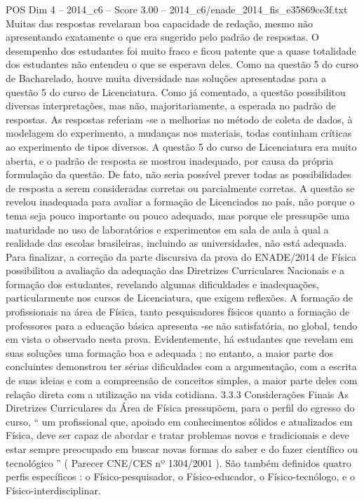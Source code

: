 \begin{textsample}{POS Dim 4 – 2014\_c6 – Score 3.00 – 2014\_c6/enade\_2014\_fis\_e35869ce3f.txt}
Muitas das respostas revelaram boa capacidade de redação, mesmo não apresentando exatamente o que era sugerido pelo padrão de respostas.
O desempenho dos estudantes foi muito fraco e ficou patente que a quase totalidade dos estudantes não entendeu o que se esperava deles.
Como na questão 5 do curso de Bacharelado, houve muita diversidade nas soluções apresentadas para a questão 5 do curso de Licenciatura.
Como já comentado, a questão possibilitou diversas interpretações, mas não, majoritariamente, a esperada no padrão de respostas.
As respostas referiam -se a melhorias no método de coleta de dados, à modelagem do experimento, a mudanças nos materiais, todas continham críticas ao experimento de tipos diversos.
A questão 5 do curso de Licenciatura era muito aberta, e o padrão de resposta se mostrou inadequado, por causa da própria formulação da questão.
De fato, não seria possível prever todas as possibilidades de resposta a serem consideradas corretas ou parcialmente corretas.
A questão se revelou inadequada para avaliar a formação de Licenciados no país, não porque o tema seja pouco importante ou pouco adequado, mas porque ele pressupõe uma maturidade no uso de laboratórios e experimentos em sala de aula à qual a realidade das escolas brasileiras, incluindo as universidades, não está adequada.
Para finalizar, a correção da parte discursiva da prova do ENADE/2014 de Física possibilitou a avaliação da adequação das Diretrizes Curriculares Nacionais e a formação dos estudantes, revelando algumas dificuldades e inadequações, particularmente nos cursos de Licenciatura, que exigem reflexões.
A formação de profissionais na área de Física, tanto pesquisadores físicos quanto a formação de professores para a educação básica apresenta -se não satisfatória, no global, tendo em vista o observado nesta prova.
Evidentemente, há estudantes que revelam em suas soluções uma formação boa e adequada ; no entanto, a maior parte dos concluintes demonstrou ter sérias dificuldades com a argumentação, com a escrita de suas ideias e com a compreensão de conceitos simples, a maior parte deles com relação direta com a utilização na vida cotidiana. 3.3.3 Considerações Finais As Diretrizes Curriculares da Área de Física pressupõem, para o perfil do egresso do curso, “ um profissional que, apoiado em conhecimentos sólidos e atualizados em Física, deve ser capaz de abordar e tratar problemas novos e tradicionais e deve estar sempre preocupado em buscar novas formas do saber e do fazer científico ou tecnológico ” ( Parecer CNE/CES nº 1304/2001 ).
São também definidos quatro perfis específicos : o Físico-pesquisador, o Físico-educador, o Físico-tecnólogo, e o Físico-interdisciplinar.

\end{textsample}
